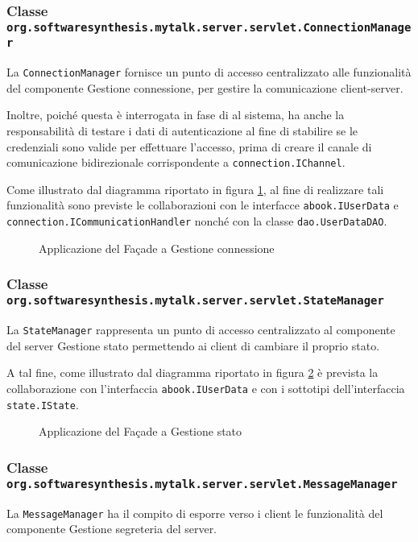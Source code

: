 \subsubsection*{Classe \texttt{org.softwaresynthesis.mytalk.server.servlet.ConnectionManager}}
La  \texttt{ConnectionManager} fornisce un punto di accesso centralizzato alle funzionalità del componente \textsf{Gestione connessione}, per gestire la comunicazione client-server.

Inoltre, poiché questa  è interrogata in fase di  al sistema, ha anche la responsabilità di testare i dati di autenticazione al fine di stabilire se le credenziali sono valide per effettuare l'accesso, prima di creare il canale di comunicazione bidirezionale corrispondente a \texttt{connection.IChannel}.

Come illustrato dal diagramma riportato in figura \ref{fig:facadeconnection}, al fine di realizzare tali funzionalità sono previste le collaborazioni con le interfacce \texttt{abook.IUserData} e \texttt{connection.ICommunicationHandler} nonché con la classe \texttt{dao.UserDataDAO}.

\begin{figure}[H]
  \centering
  \caption{Applicazione del  Façade a \textsf{Gestione connessione}}\label{fig:facadeconnection}
\end{figure}

\subsubsection*{Classe \texttt{org.softwaresynthesis.mytalk.server.servlet.StateManager}}
La  \texttt{StateManager} rappresenta un punto di accesso centralizzato al componente del server \textsf{Gestione stato} permettendo ai client di cambiare il proprio stato.

A tal fine, come illustrato dal diagramma riportato in figura \ref{fig:facadestate} è prevista la collaborazione con l'interfaccia \texttt{abook.IUserData} e con i sottotipi dell'interfaccia \texttt{state.IState}.

\begin{figure}[H]
  \centering
  \caption{Applicazione del  Façade a \textsf{Gestione stato}}\label{fig:facadestate}
\end{figure}

\subsubsection*{Classe \texttt{org.softwaresynthesis.mytalk.server.servlet.MessageManager}}
La  \texttt{MessageManager} ha il compito di esporre verso i client le funzionalità del componente \textsf{Gestione segreteria} del server.

